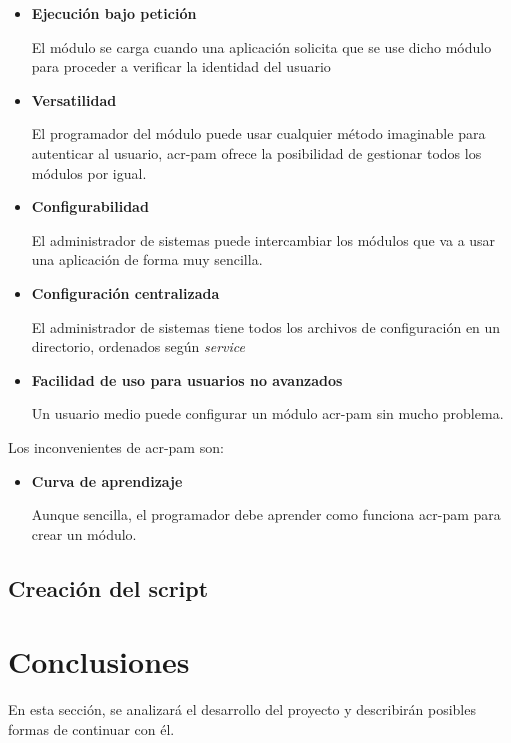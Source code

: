 \documentclass[titlepage, 12pt, a4paper]{article}
\begin{document}
{\begin{itemize}
		Al ser un módulo tan extendido, esto significa que prácticamente cualquier usuario de \gls{GNU/Linux} e incluso MacOS puede disfrutar de als ventajas del \gls{acr-dfa}
	\item{\textbf{Ejecución bajo petición}}\par
		El módulo se carga cuando una aplicación solicita que se use dicho módulo para proceder a verificar la identidad del usuario
	\item{\textbf{Versatilidad}}\par
		El programador del módulo puede usar cualquier método imaginable para autenticar al usuario, \gls{acr-pam} ofrece la posibilidad de gestionar todos los módulos por igual.
	\item{\textbf{Configurabilidad}}\par
		El administrador de sistemas puede intercambiar los módulos que va a usar una aplicación de forma muy sencilla.
	\item{\textbf{Configuración centralizada}}\par
		El administrador de sistemas tiene todos los archivos de configuración en un directorio, ordenados según \textit{service}
	\item{\textbf{Facilidad de uso para usuarios no avanzados}}\par
		Un usuario medio puede configurar un módulo \gls{acr-pam} sin mucho problema.
\end{itemize}
Los inconvenientes de \gls{acr-pam} son:
\begin{itemize}
	\item{\textbf{Curva de aprendizaje}}\par
		Aunque sencilla, el programador debe aprender como funciona \gls{acr-pam} para crear un módulo.
\end{itemize}
\subsection{Creación del script}

\clearpage
\section{Conclusiones}
En esta sección, se analizará el desarrollo del proyecto y describirán posibles formas de continuar con él.
}
\end{document}
